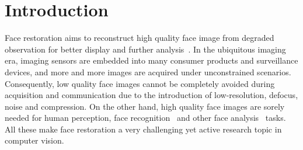 \documentclass[runningheads]{llncs}
\begin{document}
\section{Introduction}\label{section1}
Face restoration aims to reconstruct high quality face image from degraded observation for better display and further analysis~\cite{baker2000hallucinating,liu2007face,zhu2016deep,yu2016ultra,cao2017attention,chen2017fsrnet,yu2017face,huang2017wavelet,xu2017learning,yu2017hallucinating,chrysos2017deep}.
In the ubiquitous imaging era, imaging sensors are embedded into many consumer products and surveillance devices, and more and more images are acquired under unconstrained scenarios.
Consequently, low quality face images cannot be completely avoided during acquisition and communication due to the introduction of low-resolution, defocus, noise and compression.
On the other hand, high quality face images are sorely needed for human perception, face recognition~\cite{phillips2005overview} and other face analysis~\cite{andreu2014analysis} tasks.
All these make face restoration a very challenging yet active research topic in computer vision.
\end{document}
